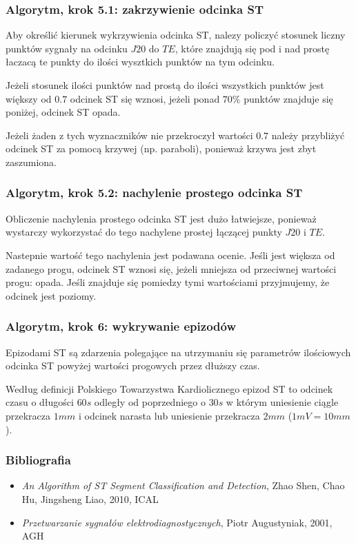 \documentclass{beamer}
\begin{document}
\begin{frame}
  \frametitle{Algorytm, krok 5.1: zakrzywienie odcinka ST}

  Aby określić kierunek wykrzywienia odcinka ST, nalezy policzyć stosunek
  liczny punktów sygnały na odcinku $J20$ do $TE$, które znajdują się pod i nad
  prostę łaczacą te punkty do ilości wysztkich punktów na tym odcinku.

  Jeżeli stosunek ilości punktów nad prostą do ilości wszystkich punktów jest
  większy od $0.7$ odcinek ST się wznosi, jeżeli ponad $70\%$ punktów znajduje
  się poniżej, odcinek ST opada. 
  
  Jeżeli żaden z tych wyznaczników nie przekroczył wartości $0.7$ należy
  przybliżyć odcinek ST za pomocą krzywej (np. paraboli), ponieważ krzywa jest
  zbyt zaszumiona.

\end{frame}


\begin{frame}
  \frametitle{Algorytm, krok 5.2: nachylenie prostego odcinka ST}
  
  Obliczenie nachylenia prostego odcinka ST jest dużo łatwiejsze, ponieważ
  wystarczy wykorzystać do tego nachylene prostej łączącej punkty $J20$ i $TE$.

  Nastepnie wartość tego nachylenia jest podawana ocenie. Jeśli jest większa od
  zadanego progu, odcinek ST wznosi się, jeżeli mniejsza od przeciwnej wartości
  progu: opada. Jeśli znajduje się pomiedzy tymi wartościami przyjmujemy, że
  odcinek jest poziomy.
\end{frame}

\begin{frame}
  \frametitle{Algorytm, krok 6: wykrywanie epizodów}


  Epizodami ST są zdarzenia polegające na utrzymaniu się parametrów ilościowych
  odcinka ST powyżej wartości progowych przez dłuższy czas.

  Według definicji Polskiego Towarzystwa Kardiolicznego epizod ST to odcinek
  czasu o długości $60s$ odległy od poprzedniego o $30s$ w którym uniesienie
  ciągle przekracza $1mm$ i odcinek narasta lub uniesienie przekracza $2mm$
  ($1mV = 10mm$).
\end{frame}

\begin{frame}
  \frametitle{Bibliografia}

  \begin{itemize}
    \item \emph{An Algorithm of ST Segment Classification and Detection}, Zhao
      Shen, Chao Hu, Jingsheng Liao, 2010, ICAL
    \item \emph{Przetwarzanie sygnałów elektrodiagnostycznych}, Piotr
      Augustyniak, 2001, AGH
  \end{itemize}
\end{frame}
\end{document}

